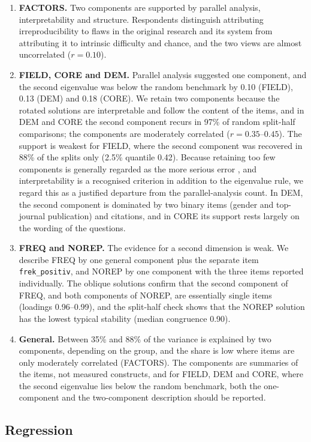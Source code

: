\documentclass[11pt,a4paper]{article}
\newcommand{\var}[1]{\texttt{#1}}
\begin{document}
\begin{enumerate}
\item \textbf{FACTORS.} Two components are supported by parallel analysis, interpretability and structure. Respondents distinguish attributing irreproducibility to flaws in the original research and its system from attributing it to intrinsic difficulty and chance, and the two views are almost uncorrelated ($r=0.10$).
\item \textbf{FIELD, CORE and DEM.} Parallel analysis suggested one component, and the second eigenvalue was below the random benchmark by 0.10 (FIELD), 0.13 (DEM) and 0.18 (CORE). We retain two components because the rotated solutions are interpretable and follow the content of the items, and in DEM and CORE the second component recurs in 97\% of random split-half comparisons; the components are moderately correlated ($r=0.35$--$0.45$). The support is weakest for FIELD, where the second component was recovered in 88\% of the splits only (2.5\% quantile 0.42). Because retaining too few components is generally regarded as the more serious error \citep{fabrigar1999}, and interpretability is a recognised criterion in addition to the eigenvalue rule, we regard this as a justified departure from the parallel-analysis count. In DEM, the second component is dominated by two binary items (gender and top-journal publication) and citations, and in CORE its support rests largely on the wording of the questions.
\item \textbf{FREQ and NOREP.} The evidence for a second dimension is weak. We describe FREQ by one general component plus the separate item \var{frek\_positiv}, and NOREP by one component with the three items reported individually. The oblique solutions confirm that the second component of FREQ, and both components of NOREP, are essentially single items (loadings 0.96--0.99), and the split-half check shows that the NOREP solution has the lowest typical stability (median congruence 0.90).
\item \textbf{General.} Between 35\% and 88\% of the variance is explained by two components, depending on the group, and the share is low where items are only moderately correlated (FACTORS). The components are summaries of the items, not measured constructs, and for FIELD, DEM and CORE, where the second eigenvalue lies below the random benchmark, both the one-component and the two-component description should be reported.
\end{enumerate}

\subsection{Regression}
\end{document}
